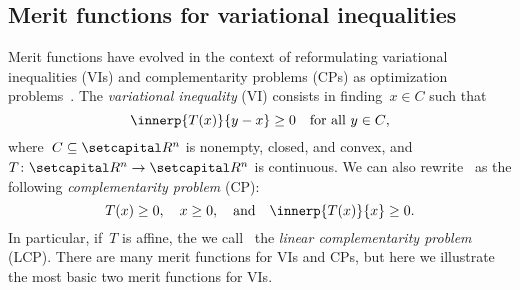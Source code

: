 \documentclass[../../main]{subfiles}
\begin{document}
\subsection{Merit functions for variational inequalities}
Merit functions have evolved in the context of reformulating variational inequalities (VIs) and complementarity problems (CPs) as optimization problems~\cite{Fukushima1996}.
The \emph{variational inequality} (VI) consists in finding~$x \in C$ such that
\begin{equation} \label{eq:VI}
    \innerp{T(x)}{y - x} \ge 0 \forallcondition{y \in C}
,\end{equation} 
where~$C \subseteq \setR^n$ is nonempty, closed, and convex, and~$T \colon \setR^n \to \setR^n$ is continuous.
We can also rewrite~ as the following \emph{complementarity problem} (CP):
\begin{equation} \label{eq:CP}
    T(x) \ge 0, \quad x \ge 0, \eqand \innerp{T(x)}{x} \ge 0
.\end{equation} 
In particular, if~$T$ is affine, the we call~ the \emph{linear complementarity problem} (LCP).
There are many merit functions for VIs and CPs, but here we illustrate the most basic two merit functions for VIs.
\end{document}
